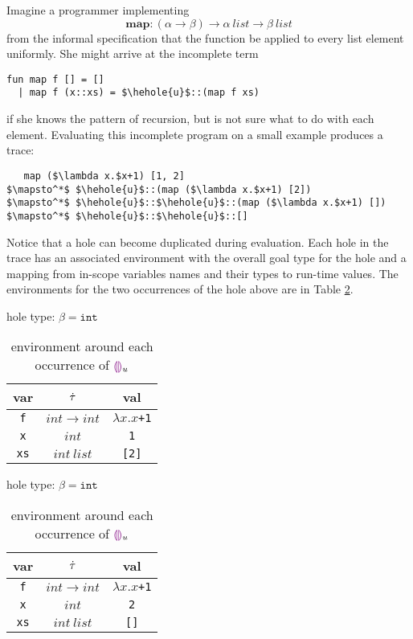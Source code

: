 Imagine a programmer implementing $$\mathbf{map} : (\alpha \to \beta) \to
\alpha ~\mathit{list} \to \beta ~\mathit{list}$$ from the informal
specification that the function be applied to every list element uniformly.
She might arrive at the incomplete term
\begin{lstlisting}
fun map f [] = []
  | map f (x::xs) = $\hehole{u}$::(map f xs)
\end{lstlisting}
if she knows the pattern of recursion, but is not sure what to do with each
element. Evaluating this incomplete program on a small example produces a
trace:
\begin{lstlisting}
   map ($\lambda x.$x+1) [1, 2]
$\mapsto^*$ $\hehole{u}$::(map ($\lambda x.$x+1) [2])
$\mapsto^*$ $\hehole{u}$::$\hehole{u}$::(map ($\lambda x.$x+1) [])
$\mapsto^*$ $\hehole{u}$::$\hehole{u}$::[]
\end{lstlisting}
Notice that a hole can become duplicated during evaluation. Each hole in
the trace has an associated environment with the overall goal type for the
hole and a mapping from in-scope variables names and their types to
run-time values. The environments for the two occurrences of the hole above
are in Table \ref{tabx}.

\begin{table}[h!]
  \begin{subtable}{.5\linewidth}
    \caption{hole type: $\beta=\texttt{int}$}
    \centering
        {
          \footnotesize
          \begin{tabular}{c|c|c}
            var & $\dot{\tau}$ & val\\
            \hline
            \texttt{f} & $int \to int$ & $\lambda x.x$\texttt{+1}\\
            \texttt{x} & $int$ & \texttt{1}\\
            \texttt{xs} & $int ~list$ & \texttt{[2]}\\
          \end{tabular}
        }
  \end{subtable}%
  \begin{subtable}{.5\linewidth}
    \caption{hole type: $\beta=\texttt{int}$}
    \centering
        {
          \footnotesize
          \begin{tabular}{c|c|c}
            var & $\dot{\tau}$ & val\\
            \hline
            \texttt{f} & $int \to int$ & $\lambda x.x$\texttt{+1}\\
            \texttt{x} & $int$ & \texttt{2}\\
            \texttt{xs} & $int ~list$ & \texttt{[]}\\
          \end{tabular}
        }
  \end{subtable}
  \caption{environment around each occurrence of $\textcolor{violet}{\llparenthesis}\textcolor{violet}{\rrparenthesis}_{u}$}
  \label{tabx}
\end{table}

